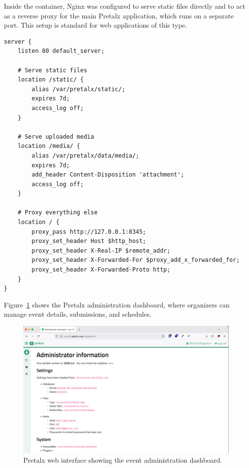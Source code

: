 Inside the container, Nginx was configured to serve static files directly and to act as a reverse proxy for the main Pretalx application, which runs on a separate port. This setup is standard for web applications of this type.

\begin{lstlisting}[caption={Pretalx Nginx configuration to proxy the application and serve static files.}]
server {
    listen 80 default_server;

    # Serve static files
    location /static/ {
        alias /var/pretalx/static/;
        expires 7d;
        access_log off;
    }

    # Serve uploaded media
    location /media/ {
        alias /var/pretalx/data/media/;
        expires 7d;
        add_header Content-Disposition 'attachment';
        access_log off;
    }

    # Proxy everything else
    location / {
        proxy_pass http://127.0.0.1:8345;
        proxy_set_header Host $http_host;
        proxy_set_header X-Real-IP $remote_addr;
        proxy_set_header X-Forwarded-For $proxy_add_x_forwarded_for;
        proxy_set_header X-Forwarded-Proto http;
    }
}
\end{lstlisting}

Figure~\ref{fig:pretalx-admin} shows the Pretalx administration dashboard, where organizers can manage event details, submissions, and schedules.

\begin{figure}[H]
	\centering
	\includegraphics[width=\textwidth]{imaxes/pretalx-admin.png}
	\caption{Pretalx web interface showing the event administration dashboard.}
	\label{fig:pretalx-admin}
\end{figure}
